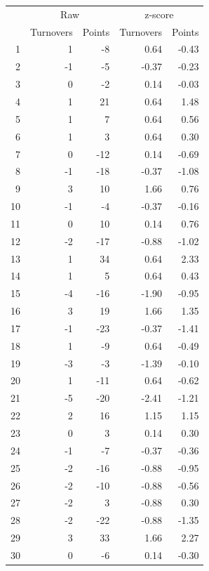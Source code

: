\documentclass{exam}
\begin{document}
  \begin{table}[H]
    \centering
    \begin{tabular}{rrrrr}
      \toprule
         & \multicolumn{2}{c}{Raw} & \multicolumn{2}{c}{z-score } \\
      \cmidrule(r){2-3} \cmidrule(r){4-5} 
         & Turnovers & Points & Turnovers & Points \\
      \midrule
      1  & 1         & -8     & 0.64      & -0.43 \\
      2  & -1        & -5     & -0.37     & -0.23 \\
      3  & 0         & -2     & 0.14      & -0.03 \\
      4  & 1         & 21     & 0.64      & 1.48 \\
      5  & 1         & 7      & 0.64      & 0.56 \\
      6  & 1         & 3      & 0.64      & 0.30 \\
      7  & 0         & -12    & 0.14      & -0.69 \\
      8  & -1        & -18    & -0.37     & -1.08 \\
      9  & 3         & 10     & 1.66      & 0.76 \\
      10 & -1        & -4     & -0.37     & -0.16 \\
      11 & 0         & 10     & 0.14      & 0.76 \\
      12 & -2        & -17    & -0.88     & -1.02 \\
      13 & 1         & 34     & 0.64      & 2.33 \\
      14 & 1         & 5      & 0.64      & 0.43 \\
      15 & -4        & -16    & -1.90     & -0.95 \\
      16 & 3         & 19     & 1.66      & 1.35 \\
      17 & -1        & -23    & -0.37     & -1.41 \\
      18 & 1         & -9     & 0.64      & -0.49 \\
      19 & -3        & -3     & -1.39     & -0.10 \\
      20 & 1         & -11    & 0.64      & -0.62 \\
      21 & -5        & -20    & -2.41     & -1.21 \\
      22 & 2         & 16     & 1.15      & 1.15 \\
      23 & 0         & 3      & 0.14      & 0.30 \\
      24 & -1        & -7     & -0.37     & -0.36 \\
      25 & -2        & -16    & -0.88     & -0.95 \\
      26 & -2        & -10    & -0.88     & -0.56 \\
      27 & -2        & 3      & -0.88     & 0.30 \\
      28 & -2        & -22    & -0.88     & -1.35 \\
      29 & 3         & 33     & 1.66      & 2.27 \\
      30 & 0         & -6     & 0.14      & -0.30 \\
       \bottomrule
    \end{tabular}
  \end{table}
\end{document}
